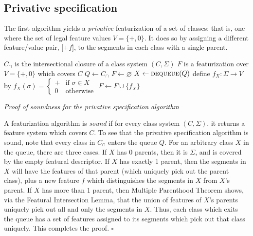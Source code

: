 \documentclass[12pt, oneside]{article}   	%
\newcommand{\featmat}[1]
{$[$#1$]$}
\begin{document}
\subsection{Privative specification}

The first algorithm yields a \textit{privative} featurization of a set of classes: that is, one where the set of legal feature values $V = \{+, 0\}$. It does so by assigning a different feature/value pair, \featmat{$+f$}, to the segments in each class with a single parent.

\noindent \begin{algorithmic}
	\singlespacing
    \REQUIRE $C_\cap$ is the intersectional closure of a class system $(C, \Sigma)$
    \ENSURE $F$ is a featurization over $V = \{ +, 0 \}$ which covers $C$
    \STATE
    \STATE $Q \leftarrow C_\cap$
    \STATE $F \leftarrow \varnothing$
    \STATE
        \STATE $X \leftarrow \textsc{dequeue}(Q)$
            \STATE define $f_X : \Sigma \rightarrow V$ by $f_X(\sigma) = \begin{cases}
                + & \mbox{if } \sigma \in X \\
                0 & \mbox{otherwise}
                \end{cases} $
            \STATE $F \leftarrow F \cup \{f_X\}$
        \ENDIF
    \ENDWHILE
\end{algorithmic}
\doublespacing

\noindent \textit{Proof of soundness for the privative specification algorithm}

A featurization algorithm is \textit{sound} if for every class system $(C, \Sigma)$, it returns a feature system which covers $C$. To see that the privative specification algorithm is sound, note that every class in $C_\cap$ enters the queue $Q$. For an arbitrary class $X$ in the queue, there are three cases. If $X$ has 0 parents, then it is $\Sigma$, and is covered by the empty featural descriptor. If $X$ has exactly 1 parent, then the segments in $X$ will have the features of that parent (which uniquely pick out the parent class), plus a new feature $f$ which distinguishes the segments in $X$ from $X$'s parent. If $X$ has more than 1 parent, then Multiple Parenthood Theorem shows, via the Featural Intersection Lemma, that the union of features of $X$'s parents uniquely pick out all and only the segments in $X$. Thus, each class which exits the queue has a set of features assigned to its segments which pick out that class uniquely. This completes the proof. $\square$
\end{document}
